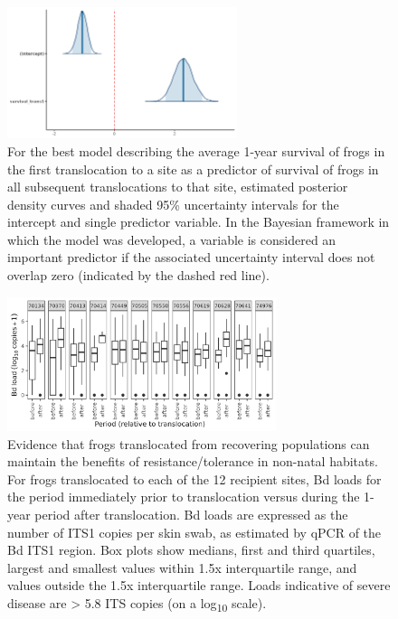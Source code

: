 \documentclass[9pt,twoside,lineno]{pnas-new}
\begin{document}
\begin{figure}

{\centering \includegraphics[width=0.60\textwidth]{figures/mcmc_areas_m2b.png}

}

\caption{\label{fig-transsurvival-postdens}For the best model describing
the average 1-year survival of frogs in the first translocation to a
site as a predictor of survival of frogs in all subsequent
translocations to that site, estimated posterior density curves and
shaded 95\% uncertainty intervals for the intercept and single predictor
variable. In the Bayesian framework in which the model was developed, a
variable is considered an important predictor if the associated
uncertainty interval does not overlap zero (indicated by the dashed red
line).}

\end{figure}\clearpage

\begin{figure}

{\centering \includegraphics[width=0.7\textwidth]{figures/bdload_beforeafter.png}

}

\caption{\label{fig-bdload-beforeafter}Evidence that frogs translocated
from recovering populations can maintain the benefits of
resistance/tolerance in non-natal habitats. For frogs translocated to
each of the 12 recipient sites, Bd loads for the period immediately
prior to translocation versus during the 1-year period after
translocation. Bd loads are expressed as the number of ITS1 copies per
skin swab, as estimated by qPCR of the Bd ITS1 region. Box plots show
medians, first and third quartiles, largest and smallest values within
1.5x interquartile range, and values outside the 1.5x interquartile
range. Loads indicative of severe disease are \textgreater{} 5.8 ITS
copies (on a log\textsubscript{10} scale).}

\end{figure}\clearpage
\end{document}
